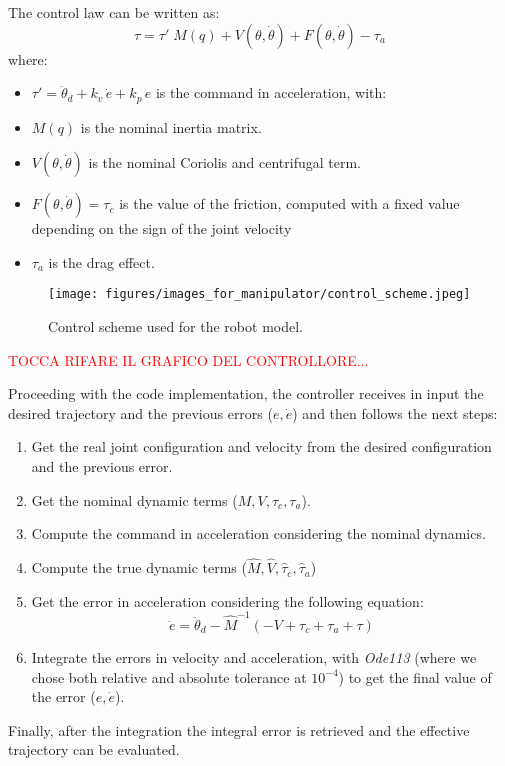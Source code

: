 \documentclass[main.tex]{subfiles}
\begin{document}
The control law can be written as:
$$ \tau = \tau'\;M(q) + V(\theta,\dot\theta)+F(\theta,\dot\theta)-\tau_a$$
where:
\begin{itemize}
    \item {$\tau'=\ddot{\theta}_d+k_v\,\dot{e}+k_p\,e$ is the command in acceleration, with:
        }
    \item{$M(q)$ is the nominal inertia matrix.}
    \item{$V(\theta,\dot\theta)$ is the nominal Coriolis and centrifugal term.}
    \item{$F(\theta,\dot\theta) = \tau_c $ is the value of the friction, computed with a fixed value depending on the sign of the joint velocity}
    \item{$\tau_a$ is the drag effect.}
    
\end{itemize}

\begin{figure}[htp]
    \texttt{[image: figures/images\_for\_manipulator/control\_scheme.jpeg]}
    \caption{Control scheme used for the robot model.}
\label{fig:ConSch}
\end{figure}
\textcolor{red}{TOCCA RIFARE IL GRAFICO DEL CONTROLLORE...}

Proceeding with the code implementation, the controller receives in input the desired trajectory and the previous errors ($e,\dot e$) and then follows the next steps:\\
\begin{enumerate}
    \item {Get the real joint configuration and velocity from the desired configuration and the previous error.}
    \item Get the nominal dynamic terms ($M,V,\tau_c,\tau_a$).
    \item Compute the command in acceleration considering the nominal dynamics.
    \item Compute the true dynamic terms ($\hat M,\hat V,\hat \tau_c,\hat \tau_a$)
    \item Get the error in acceleration considering the following equation:
    $$\ddot{e}=\ddot{\theta}_d- \hat M^{-1} (-V+\tau_c+\tau_a+\tau)$$
    \item Integrate the errors in velocity and acceleration, with \textit{Ode113} (where we chose both relative and absolute tolerance at $10^{-4}$) to get the final value of the error ($e,\dot e$).
\end{enumerate}
Finally, after the integration the integral error is retrieved and the effective trajectory can be evaluated.\\
\end{document}
